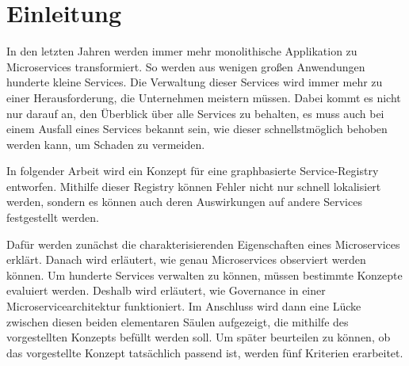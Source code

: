 \documentclass[
	12pt,
	BCOR=5mm,
	DIV=12,
	headinclude=on,
	footinclude=off,
	parskip=half,
	bibliography=totoc,
	listof=entryprefix,
	toc=listof,
	numbers=noenddot,
	plainfootsepline
]{scrreprt}
\begin{document}






\normalfont



\tableofcontents

\listoffigures

\listoftables




\clearpage
\ihead{\chaptername~\thechapter}
\ohead{\headmark}


\chapter{Einleitung}

In den letzten Jahren werden immer mehr monolithische Applikation zu Microservices transformiert. So werden aus wenigen großen Anwendungen hunderte kleine Services. Die Verwaltung dieser Services wird immer mehr zu einer Herausforderung, die Unternehmen meistern müssen. Dabei kommt es nicht nur darauf an, den Überblick über alle Services zu behalten, es muss auch bei einem Ausfall eines Services bekannt sein, wie dieser schnellstmöglich behoben werden kann, um Schaden zu vermeiden. 

In folgender Arbeit wird ein Konzept für eine graphbasierte Service-Registry entworfen. Mithilfe dieser Registry können Fehler nicht nur schnell lokalisiert werden, sondern es können auch deren Auswirkungen auf andere Services festgestellt werden.

Dafür werden zunächst die charakterisierenden Eigenschaften eines Microservices erklärt. Danach wird erläutert, wie genau Microservices observiert werden können. Um hunderte Services verwalten zu können, müssen bestimmte Konzepte evaluiert werden. Deshalb wird erläutert, wie Governance in einer Microservicearchitektur funktioniert. Im Anschluss wird dann eine Lücke zwischen diesen beiden elementaren Säulen aufgezeigt, die mithilfe des vorgestellten Konzepts befüllt werden soll. Um später beurteilen zu können, ob das vorgestellte Konzept tatsächlich passend ist, werden fünf Kriterien erarbeitet.
\end{document}

